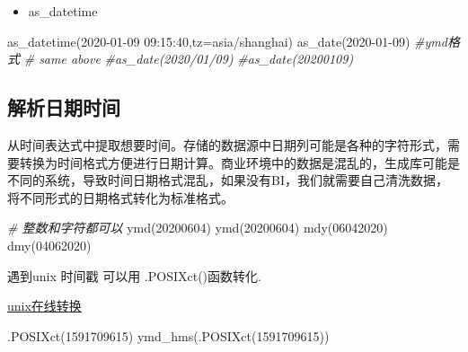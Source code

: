 \documentclass[
]{book}
\newenvironment{Shaded}{\begin{snugshade}}{\end{snugshade}}
\newcommand{\AttributeTok}[1]{\textcolor[rgb]{0.77,0.63,0.00}{#1}}
\newcommand{\CommentTok}[1]{\textcolor[rgb]{0.56,0.35,0.01}{\textit{#1}}}
\newcommand{\DecValTok}[1]{\textcolor[rgb]{0.00,0.00,0.81}{#1}}
\newcommand{\FunctionTok}[1]{\textcolor[rgb]{0.00,0.00,0.00}{#1}}
\newcommand{\NormalTok}[1]{#1}
\newcommand{\StringTok}[1]{\textcolor[rgb]{0.31,0.60,0.02}{#1}}
\providecommand{\tightlist}{%
  \setlength{\itemsep}{0pt}\setlength{\parskip}{0pt}}
\begin{document}
\begin{itemize}
\tightlist
\item
  as\_datetime
\end{itemize}

\begin{Shaded}
\begin{Highlighting}[]
\FunctionTok{as\_datetime}\NormalTok{(}\StringTok{\textquotesingle{}2020{-}01{-}09 09:15:40\textquotesingle{}}\NormalTok{,}\AttributeTok{tz=}\StringTok{\textquotesingle{}asia/shanghai\textquotesingle{}}\NormalTok{)}
\FunctionTok{as\_date}\NormalTok{(}\StringTok{\textquotesingle{}2020{-}01{-}09\textquotesingle{}}\NormalTok{) }\CommentTok{\#ymd格式}
\CommentTok{\# same above}
\CommentTok{\#as\_date(\textquotesingle{}2020/01/09\textquotesingle{})}
\CommentTok{\#as\_date(\textquotesingle{}20200109\textquotesingle{})}
\end{Highlighting}
\end{Shaded}

\hypertarget{ux89e3ux6790ux65e5ux671fux65f6ux95f4}{%
\subsection{解析日期时间}\label{ux89e3ux6790ux65e5ux671fux65f6ux95f4}}

从时间表达式中提取想要时间。存储的数据源中日期列可能是各种的字符形式，需要转换为时间格式方便进行日期计算。商业环境中的数据是混乱的，生成库可能是不同的系统，导致时间日期格式混乱，如果没有BI，我们就需要自己清洗数据，将不同形式的日期格式转化为标准格式。

\begin{Shaded}
\begin{Highlighting}[]

\CommentTok{\# 整数和字符都可以}
\FunctionTok{ymd}\NormalTok{(}\DecValTok{20200604}\NormalTok{) }
\FunctionTok{ymd}\NormalTok{(}\StringTok{\textquotesingle{}20200604\textquotesingle{}}\NormalTok{)}
\FunctionTok{mdy}\NormalTok{(}\DecValTok{06042020}\NormalTok{)}
\FunctionTok{dmy}\NormalTok{(}\DecValTok{04062020}\NormalTok{)}
\end{Highlighting}
\end{Shaded}

遇到unix 时间戳 可以用 .POSIXct()函数转化.

\href{https://unixtime.51240.com/}{unix在线转换}

\begin{Shaded}
\begin{Highlighting}[]
\FunctionTok{.POSIXct}\NormalTok{(}\DecValTok{1591709615}\NormalTok{)}
\FunctionTok{ymd\_hms}\NormalTok{(}\FunctionTok{.POSIXct}\NormalTok{(}\DecValTok{1591709615}\NormalTok{))}
\end{Highlighting}
\end{Shaded}
\end{document}
